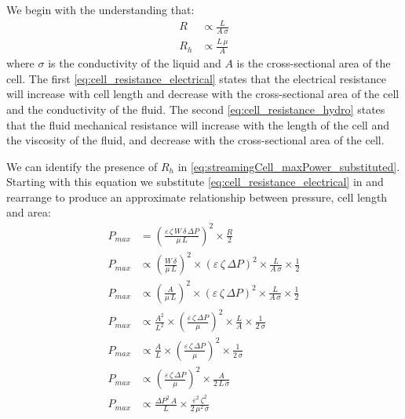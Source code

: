      We begin with the understanding that:
      \begin{align}
          R & \propto \frac{L}{A\,\sigma}\label{eq:cell_resistance_electrical}\\
          R_{h} & \propto \frac{L\,\mu}{A}\label{eq:cell_resistance_hydro}
      \end{align}
      where $\sigma$ is the conductivity of the liquid and $A$ is the cross-sectional area of the cell.
      The first \cref{eq:cell_resistance_electrical} states that the electrical resistance will increase with cell length and decrease with the cross-sectional area of the cell and the conductivity of the fluid.
      The second \cref{eq:cell_resistance_hydro} states that the fluid mechanical resistance will increase with the length of the cell and the viscosity of the fluid, and decrease with the cross-sectional area of the cell.

      We can identify the presence of $R_{h}$ in \cref{eq:streamingCell_maxPower_substituted}.
      Starting with this equation we substitute \cref{eq:cell_resistance_electrical} in and rearrange to produce an approximate relationship between pressure, cell length and area:
      \begin{align}
          P_{max} & = \left(\frac{\varepsilon\,\zeta\,W\,\delta\,\Delta P}{\mu\,L}\right)^{2}\times\frac{R}{2}\nonumber\\
          P_{max} & \propto \left(\frac{W\,\delta}{\mu\,L}\right)^{2}\times\left(\varepsilon\,\zeta\,\Delta P\right)^{2}\times \frac{L}{A\,\sigma} \times\frac{1}{2}\nonumber\\
          P_{max} & \propto \left(\frac{A}{\mu\,L}\right)^{2}\times\left(\varepsilon\,\zeta\,\Delta P\right)^{2}\times \frac{L}{A\,\sigma} \times\frac{1}{2}\nonumber\\
          P_{max} & \propto \frac{A^{2}}{L^{2}}\times\left(\frac{\varepsilon\,\zeta\,\Delta P}{\mu}\right)^{2}\times \frac{L}{A} \times\frac{1}{2\,\sigma}\nonumber\\
          P_{max} & \propto \frac{A}{L}\times\left(\frac{\varepsilon\,\zeta\,\Delta P}{\mu}\right)^{2}\times\frac{1}{2\,\sigma}\nonumber\\
          P_{max} & \propto \left(\frac{\varepsilon\,\zeta\,\Delta P}{\mu}\right)^{2}\times\frac{A}{2\,L\,\sigma}\nonumber\\
          P_{max} & \propto \frac{\Delta P^{2}\,A}{L}\times \frac{\varepsilon^{2}\,\zeta^{2}}{2\,\mu^{2}\,\sigma}
          \label{eq:streamingCell_maxPower_relationship}
      \end{align}

